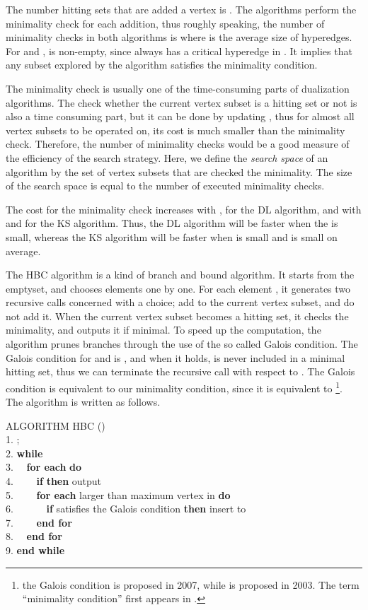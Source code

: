 The number hitting sets that are added a vertex is .
The algorithms perform the minimality check for each addition, thus roughly
 speaking, the number of minimality checks in both algorithms is
  where  is the average
 size of hyperedges.
For  and ,  is non-empty, 
 since  always has a critical hyperedge in .
It implies that any subset  explored by the algorithm satisfies the
 minimality condition.

The minimality check is usually one of the time-consuming parts of
 dualization algorithms.
The check whether the current vertex subset is a hitting set or not is
 also a time consuming part, but it can be done by updating ,
 thus for almost all vertex subsets to be operated on,
 its cost is much smaller than the minimality check.
Therefore, the number of minimality checks would be a good measure of
 the efficiency of the search strategy.
Here, we define the {\em search space} of an algorithm by the set of vertex
 subsets that are checked the minimality.
The size of the search space is equal to the number of executed
 minimality checks.

The cost for the minimality check increases with , 
 for the DL algorithm, and with  and  for the KS algorithm.
Thus, the DL algorithm will be faster when the  is small,
 whereas the KS algorithm will be faster when  is small and
  is small on average.



The HBC algorithm is a kind of branch and bound algorithm.
It starts from the emptyset, and chooses elements one by one.
For each element , it generates two recursive calls concerned with a choice;  add  to the current vertex subset, and do not add it.
When the current vertex subset becomes a hitting set, it checks the
 minimality, and outputs it if minimal.
To speed up the computation, the algorithm prunes branches through the use
 of the so called Galois condition.
The Galois condition for  and  is
 , and when it holds,  is
 never included in a minimal hitting set,
 thus we can terminate the recursive call with respect to .
The Galois condition is equivalent to our minimality condition, since it
 is equivalent to \footnote{the Galois condition
 is proposed in 2007\cite{HcBa07}, while  is proposed in
 2003\cite{IBE,IBE2}.
The term ``minimality condition'' first appears in \cite{HcBa07}.}.
The algorithm is written as follows.

\begin{tabbing}
ALGORITHM HBC ()\\
1.  ; \\
2. {\bf while} \\
3. \ \ {\bf for each}  {\bf do}\\
4. \ \ \ \ {\bf if}  {\bf then} output \\
5. \ \ \ \ {\bf for each}  larger than maximum vertex in  {\bf do}\\
6. \ \ \ \ \ \ {\bf if}  satisfies the Galois condition {\bf then} insert  to \\
7. \ \ \ \ {\bf end for}\\
8. \ \ {\bf end for}\\
9. {\bf end while}\\
\end{tabbing}


